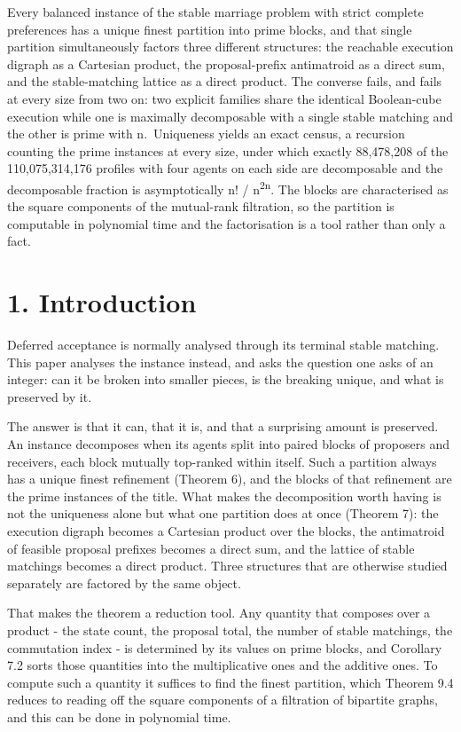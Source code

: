 \documentclass[
  11pt,
]{article}
\begin{document}
Every balanced instance of the stable marriage problem with strict
complete preferences has a unique finest partition into prime blocks,
and that single partition simultaneously factors three different
structures: the reachable execution digraph as a Cartesian product, the
proposal-prefix antimatroid as a direct sum, and the stable-matching
lattice as a direct product. The converse fails, and fails at every size
from two on: two explicit families share the identical Boolean-cube
execution while one is maximally decomposable with a single stable
matching and the other is prime with n.~Uniqueness yields an exact
census, a recursion counting the prime instances at every size, under
which exactly 88,478,208 of the 110,075,314,176 profiles with four
agents on each side are decomposable and the decomposable fraction is
asymptotically n! / n\textsuperscript{2n}. The blocks are characterised
as the square components of the mutual-rank filtration, so the partition
is computable in polynomial time and the factorisation is a tool rather
than only a fact.

\hypertarget{introduction}{%
\section{1. Introduction}\label{introduction}}

Deferred acceptance is normally analysed through its terminal stable
matching. This paper analyses the instance instead, and asks the
question one asks of an integer: can it be broken into smaller pieces,
is the breaking unique, and what is preserved by it.

The answer is that it can, that it is, and that a surprising amount is
preserved. An instance decomposes when its agents split into paired
blocks of proposers and receivers, each block mutually top-ranked within
itself. Such a partition always has a unique finest refinement (Theorem
6), and the blocks of that refinement are the prime instances of the
title. What makes the decomposition worth having is not the uniqueness
alone but what one partition does at once (Theorem 7): the execution
digraph becomes a Cartesian product over the blocks, the antimatroid of
feasible proposal prefixes becomes a direct sum, and the lattice of
stable matchings becomes a direct product. Three structures that are
otherwise studied separately are factored by the same object.

That makes the theorem a reduction tool. Any quantity that composes over
a product - the state count, the proposal total, the number of stable
matchings, the commutation index - is determined by its values on prime
blocks, and Corollary 7.2 sorts those quantities into the multiplicative
ones and the additive ones. To compute such a quantity it suffices to
find the finest partition, which Theorem 9.4 reduces to reading off the
square components of a filtration of bipartite graphs, and this can be
done in polynomial time.
\end{document}

